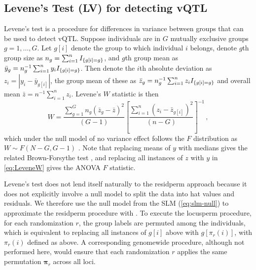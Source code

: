 
\subsection{Levene's Test (LV) for detecting vQTL}
  Levene's test is a procedure for differences in variance between groups that can be used to detect vQTL.
  Suppose individuals are in $G$ mutually exclusive groups $g=1,\dots,G$. Let $g[i]$ denote the group to which individual $i$ belongs, denote $g$th group size as $n_g=\sum_{i=1}^n I_{\left\{ {g[i]=g} \right\}}$, and $g$th group mean as $\bar{y}_g=n_g^{-1}\sum_{i=1}^n y_i I_{\left\{ {g[i]=g} \right\}}$. 
  Then denote the $i$th absolute deviation as $z_i =|y_i-\bar{y}_{g[i]}|$, the group mean of these as $\bar{z}_g=n_g^{-1}\sum_{i=1}^n z_iI_{\left\{ {g[i]=g} \right\}}$ and overall mean $\bar{z} = n^{-1}\sum_{i=1}^n z_i$. Levene's $W$ statistic is then
  \begin{equation}\label{eq:LeveneW}
    W = \frac{
      \sum_{g=1}^G n_g\left( \bar{z}_g - \bar{z}\right)^2
    }{
      (G - 1)
    }
    \left[\frac{\sum_{i=1}^n (z_i - \bar{z}_{g[i]})^2}{(n - G)}\right]^{-1}\,,
  \end{equation}
  which under the null model of no variance effect follows the $F$ distribution as $W \sim F(N - G, G - 1)$ \citep{Levene1960}.
  Note that replacing means of $y$ with medians gives the related Brown-Forsythe test \citep{Brown1973}, and replacing all instances of $z$ with $y$ in \autoref{eq:LeveneW} gives the ANOVA $F$ statistic.

  Levene's test does not lend itself naturally to the residperm approach because it does not explicitly involve a null model to split the data into hat values and residuals.
  We therefore use the null model from the SLM (\autoref{eq:slm-null}) to approximate the residperm procedure with \Lev.
  To execute the locusperm procedure, for each randomization $r$, the group labels are permuted among the individuals, which is equivalent to replacing all instances of $g[i]$ above with $g[\pi_r(i)]$, with $\pi_r(i)$ defined as above.
  A corresponding genomewide procedure, although not performed here, would ensure that each randomization $r$ applies the same permutation $\bm{\pi}_r$ across all loci. 

